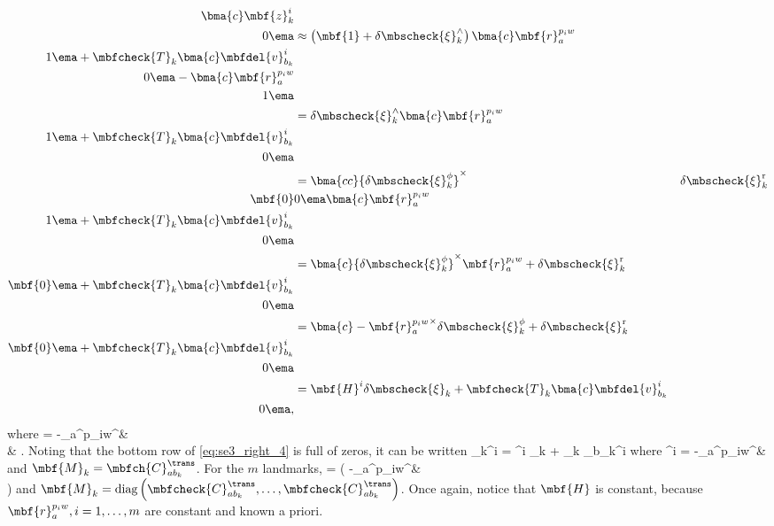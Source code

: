 \begin{align}
	\bma{c} \mbf{z}_k^i \\ 0 \ema &\approx \left(\mbf{1} + \delta \mbscheck{\xi}_k^\wedge\right) 
\bma{c}
	\mbf{r}_a^{p_iw} \\
	1
\ema +
\mbfcheck{T}_k
\bma{c}
	\mbfdel{v}_{b_k}^i \\
	0
\ema - 	
\bma{c}
	\mbf{r}_a^{p_iw} \\
	1
\ema \nonumber \\
	& = \delta \mbscheck{\xi}_k^\wedge 
\bma{c}
	\mbf{r}_a^{p_iw} \\
	1
\ema + \mbfcheck{T}_k
\bma{c}
	\mbfdel{v}_{b_k}^i \\
	0
\ema \nonumber \\
	& =  
\bma{cc}
	{\delta\mbscheck{\xi}_k^{\phi}}^\times & \delta\mbscheck{\xi}_k^\textrm{r} \\
 	\mbf{0} & 0 
\ema 
\bma{c}
	\mbf{r}_a^{p_iw} \\
	1
\ema + \mbfcheck{T}_k
\bma{c}
	\mbfdel{v}_{b_k}^i \\
	0
\ema \nonumber \\
	& =  
\bma{c}
	{\delta\mbscheck{\xi}_k^{\phi}}^\times\mbf{r}_a^{p_iw} + \delta\mbscheck{\xi}_k^\textrm{r} \\
 	\mbf{0} 
\ema 
 + \mbfcheck{T}_k
\bma{c}
	\mbfdel{v}_{b_k}^i \\
	0
\ema \nonumber \\
	& =  
\bma{c}
	-{\mbf{r}_a^{p_iw}}^\times{\delta\mbscheck{\xi}_k^{\phi}} + \delta\mbscheck{\xi}_k^\textrm{r} \\
 	\mbf{0} 
\ema 
 + \mbfcheck{T}_k
\bma{c}
	\mbfdel{v}_{b_k}^i \\
	0
\ema \nonumber \\
	& =  
	\mbf{H}^i \delta \mbscheck{\xi}_k + \mbfcheck{T}_k
\bma{c}
	\mbfdel{v}_{b_k}^i \\
	0
\ema , \label{eq:se3_right_4}
\end{align}
where 
\bdis
	 = 
		-{_a^{p_iw}}^\times &  \\
		\mbf{0} & 
	\ema.
\edis
Noting that the bottom row of \eqref{eq:se3_right_4} is full of zeros, it can be written
\bdis
	_k^i = ^i \delta \mbscheck{\xi}_k + _k _{b_k}^i
\edis
where
\bdis
	^i = 
		-{_a^{p_iw}}^\times &  \\
	\ema
\edis
and $\mbf{M}_k = \mbfch{C}_{ab_k}^\trans$. For the $m$ landmarks,
\beq
	 = \left(
		-{_a^{p_iw}}^\times &  \\
	\ema
	\right) \label{eq:se3_H_riekf}
\eeq
and $\mbf{M}_k = \textrm{diag}\left(\mbfcheck{C}_{ab_k}^\trans,\ldots,\mbfcheck{C}_{ab_k}^\trans\right)$. Once again, notice that $\mbf{H}$ is constant, because $\mbf{r}_a^{p_i w} ,  i = 1,  \ldots , m$ are constant and known a priori.

